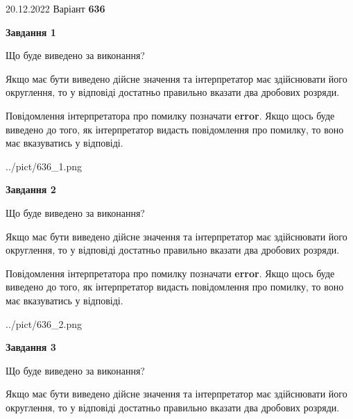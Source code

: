 \documentclass[12pt, ukrainian]{article}
\begin{document}
{20.12.2022 Варіант \No \textbf { 636 }\par}
{
\begin {Large}

{\begin {center}\textbf{Завдання 1}\end {center}}\par
Що буде виведено за виконання? \par

Якщо має бути виведено дійсне значення та інтерпретатор має здійснювати його округлення, 
то у відповіді достатньо правильно вказати два дробових розряди.

Повідомлення інтерпретатора про помилку позначати \textbf{error}.
Якщо щось буде виведено до того, як інтерпретатор видасть повідомлення про помилку, 
то воно має вказуватись у відповіді. \par

\begin{center}
	{../pict/636_1.png}
\end{center}
\newpage

{\begin {center}\textbf{Завдання 2}\end {center}}\par
Що буде виведено за виконання? \par

Якщо має бути виведено дійсне значення та інтерпретатор має здійснювати його округлення, 
то у відповіді достатньо правильно вказати два дробових розряди.

Повідомлення інтерпретатора про помилку позначати \textbf{error}.
Якщо щось буде виведено до того, як інтерпретатор видасть повідомлення про помилку, 
то воно має вказуватись у відповіді. \par

\begin{center}
	{../pict/636_2.png}
\end{center}
\newpage

{\begin {center}\textbf{Завдання 3}\end {center}}\par
Що буде виведено за виконання? \par

Якщо має бути виведено дійсне значення та інтерпретатор має здійснювати його округлення, 
то у відповіді достатньо правильно вказати два дробових розряди.


\end{Large}}
\end{document}
